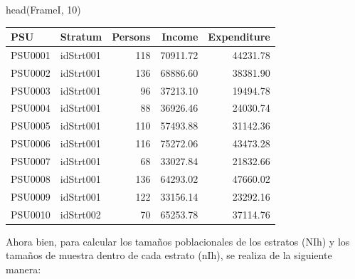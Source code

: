 \documentclass[
  12pt,
]{book}
\newenvironment{Shaded}{\begin{snugshade}}{\end{snugshade}}
\newcommand{\AttributeTok}[1]{\textcolor[rgb]{0.77,0.63,0.00}{#1}}
\newcommand{\DecValTok}[1]{\textcolor[rgb]{0.00,0.00,0.81}{#1}}
\newcommand{\FunctionTok}[1]{\textcolor[rgb]{0.00,0.00,0.00}{#1}}
\newcommand{\NormalTok}[1]{#1}
\newcommand{\OtherTok}[1]{\textcolor[rgb]{0.56,0.35,0.01}{#1}}
\newcommand{\SpecialCharTok}[1]{\textcolor[rgb]{0.00,0.00,0.00}{#1}}
\begin{document}
\begin{Shaded}
\begin{Highlighting}[]
\FunctionTok{head}\NormalTok{(FrameI, }\DecValTok{10}\NormalTok{)}
\end{Highlighting}
\end{Shaded}

\begin{tabular}{l|l|r|r|r}
\hline
PSU & Stratum & Persons & Income & Expenditure\\
\hline
PSU0001 & idStrt001 & 118 & 70911.72 & 44231.78\\
\hline
PSU0002 & idStrt001 & 136 & 68886.60 & 38381.90\\
\hline
PSU0003 & idStrt001 & 96 & 37213.10 & 19494.78\\
\hline
PSU0004 & idStrt001 & 88 & 36926.46 & 24030.74\\
\hline
PSU0005 & idStrt001 & 110 & 57493.88 & 31142.36\\
\hline
PSU0006 & idStrt001 & 116 & 75272.06 & 43473.28\\
\hline
PSU0007 & idStrt001 & 68 & 33027.84 & 21832.66\\
\hline
PSU0008 & idStrt001 & 136 & 64293.02 & 47660.02\\
\hline
PSU0009 & idStrt001 & 122 & 33156.14 & 23292.16\\
\hline
PSU0010 & idStrt002 & 70 & 65253.78 & 37114.76\\
\hline
\end{tabular}

Ahora bien, para calcular los tamaños poblacionales de los estratos (NIh) y los tamaños de muestra dentro de cada estrato (nIh), se realiza de la siguiente manera:

\begin{Shaded}
\end{Shaded}
\end{document}
